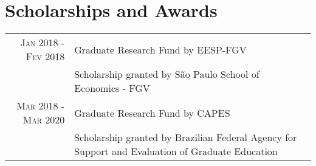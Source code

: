 \documentclass[a4paper,10pt]{article}
\begin{document}
\section{Scholarships and Awards}
\begin{tabular}{r|p{10.5cm}}
\textsc{Jan} 2018 - \textsc{Fev} 2018 & Graduate Research Fund by EESP-FGV\\
 &\footnotesize{Scholarship granted by São Paulo School of Economics - FGV}
 \\
\textsc{Mar} 2018 - \textsc{Mar} 2020 & Graduate Research Fund by CAPES\\
 &\footnotesize{Scholarship granted by Brazilian Federal Agency for Support and Evaluation of Graduate Education}
\end{tabular}


\begin{comment}
\section{Extracurricular Activities }
\begin{tabular}{r|p{11cm}}
 \textsc{Feb. 2013 - April 2015} & Director at \textsc{Bandeira Científica} \\&\footnotesize{Bandeira Científica is an interdisciplinary project created and conducted by University of São Paulo’s academic community aimed at providing medical aid and consulting in health care public policies to different cities across the country. As a Director, I was responsible for working closely to the administrative bodies from the cities we would visit to arrange for transportation, accomodation and work infrasctructure to the more than 150 members of the project. I also took part in a variety of specific activites, such as implementing an eletronic health record system in Ibatiba, Espírito Santo, Brazil.}\\\multicolumn{2}{c}{} \\
  \textsc{Jan. 2014 - Dec. 2014} & Member of the \textsc{Student Union} \\&\footnotesize{Elected officer to represent the student body both internally and externally to the academic community. }\\\multicolumn{2}{c}{} \\
\end{tabular}
\end{comment}
\end{document}
